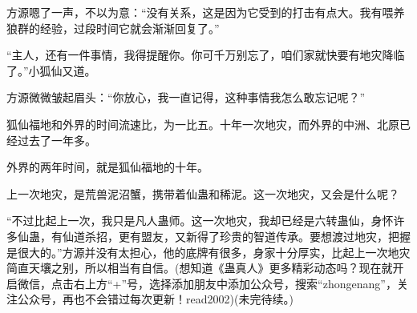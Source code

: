 \begin{this_body}
方源嗯了一声，不以为意：“没有关系，这是因为它受到的打击有点大。我有喂养狼群的经验，过段时间它就会渐渐回复了。”

“主人，还有一件事情，我得提醒你。你可千万别忘了，咱们家就快要有地灾降临了。”小狐仙又道。

方源微微皱起眉头：“你放心，我一直记得，这种事情我怎么敢忘记呢？”

狐仙福地和外界的时间流速比，为一比五。十年一次地灾，而外界的中洲、北原已经过去了一年多。

外界的两年时间，就是狐仙福地的十年。

上一次地灾，是荒兽泥沼蟹，携带着仙蛊和稀泥。这一次地灾，又会是什么呢？

“不过比起上一次，我只是凡人蛊师。这一次地灾，我却已经是六转蛊仙，身怀许多仙蛊，有仙道杀招，更有盟友，又新得了珍贵的智道传承。要想渡过地灾，把握是很大的。”方源并没有太担心，他的底牌有很多，身家十分厚实，比起上一次地灾简直天壤之别，所以相当有自信。(想知道《蛊真人》更多精彩动态吗？现在就开启微信，点击右上方“+”号，选择添加朋友中添加公众号，搜索“zhongenang”，关注公众号，再也不会错过每次更新！read2002)(未完待续。)

\end{this_body}

